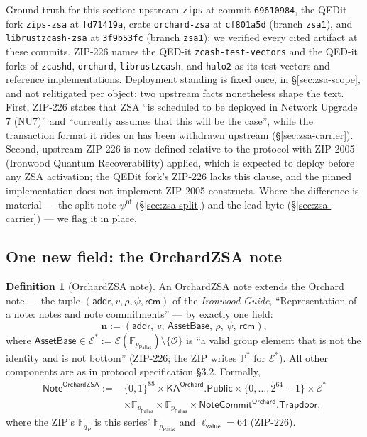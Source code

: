 \documentclass[11pt,a4paper]{article}
\theoremstyle{definition}
\newtheorem{definition}[theorem]{Definition}
\newcommand{\F}{\mathbb{F}}
\newcommand{\nfsym}{\mathsf{nf}}
\newcommand{\Pallas}{\ensuremath{\mathsf{Pallas}}}
\newcommand{\Ep}{\ensuremath{\mathcal{E}}}
\newcommand{\NoteCommit}{\ensuremath{\mathsf{NoteCommit}}}
\newcommand{\rcm}{\ensuremath{\mathsf{rcm}}}
\begin{document}
Ground truth for this section: upstream \texttt{zips} at commit
\texttt{69610984}, the QEDit fork \texttt{zips-zsa} at \texttt{fd71419a},
crate \texttt{orchard-zsa} at \texttt{cf801a5d} (branch \texttt{zsa1}), and
\texttt{librustzcash-zsa} at \texttt{3f9b53fc} (branch \texttt{zsa1}); we
verified every cited artifact at these commits. ZIP-226 names the QED-it
\texttt{zcash-test-vectors} and the QED-it forks of \texttt{zcashd},
\texttt{orchard}, \texttt{librustzcash}, and \texttt{halo2} as its test
vectors and reference implementations. Deployment standing is fixed once, in
\S\ref{sec:zsa-scope}, and not relitigated per object; two upstream facts
nonetheless shape the text. First, ZIP-226 states that ZSA ``is scheduled to
be deployed in Network Upgrade 7 (NU7)'' and ``currently assumes that this
will be the case'', while the transaction format it rides on has been
withdrawn upstream (\S\ref{sec:zsa-carrier}). Second, upstream ZIP-226 is now
defined relative to the protocol with ZIP-2005 (Ironwood Quantum
Recoverability) applied, which is expected to deploy before any ZSA
activation; the QEDit fork's ZIP-226 lacks this clause, and the pinned
implementation does not implement ZIP-2005 constructs. Where the difference
is material --- the split-note $\psi^{\nfsym}$
(\S\ref{sec:zsa-split}) and the lead byte (\S\ref{sec:zsa-carrier}) --- we
flag it in place.

\subsection{One new field: the OrchardZSA note}\label{sec:zsa-note}

\begin{definition}[OrchardZSA note]\label{def:zsa-note}
An OrchardZSA note extends the Orchard note --- the tuple
$(\mathsf{addr}, v, \rho, \psi, \rcm)$ of the \emph{Ironwood Guide},
``Representation of a note: notes and note commitments'' --- by exactly one
field:
\[
\mathbf{n} :=
(\mathsf{addr},\, v,\, \mathsf{AssetBase},\, \rho,\, \psi,\, \rcm),
\]
where $\mathsf{AssetBase} \in \Ep^{*} := \Ep(\F_{p_{\Pallas}}) \setminus
\{\mathcal{O}\}$ is ``a valid group element that is not the identity and is
not bottom'' (ZIP-226; the ZIP writes $\mathbb{P}^*$ for $\Ep^{*}$). All
other components are as in protocol specification \S3.2. Formally,
\[
\begin{aligned}
\mathsf{Note}^{\mathsf{OrchardZSA}} :={}&
  \{0,1\}^{88} \times \mathsf{KA}^{\mathsf{Orchard}}.\mathsf{Public}
  \times \{0, \dots, 2^{64}-1\} \times \Ep^{*} \\
&\times \F_{p_{\Pallas}} \times \F_{p_{\Pallas}}
  \times \NoteCommit^{\mathsf{Orchard}}.\mathsf{Trapdoor},
\end{aligned}
\]
where the ZIP's $\F_{q_P}$ is this series' $\F_{p_{\Pallas}}$ and
$\ell_{\mathsf{value}} = 64$ (ZIP-226).
\end{definition}
\end{document}
